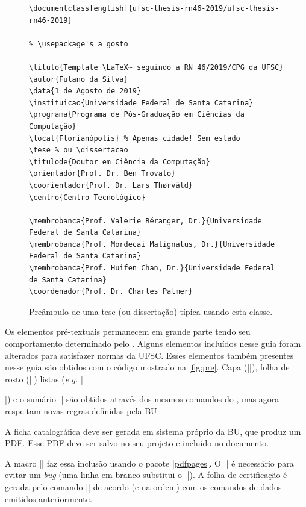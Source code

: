 \documentclass[embeddedlogo]{../ufsc-thesis-rn46-2019}
\begin{document}
\begin{figure}[tb]
  \centering
  \caption{Preâmbulo de uma tese (ou dissertação) típica usando esta classe.}
  \label{fig:preambulo}

  \begin{verbatim}
\documentclass[english]{ufsc-thesis-rn46-2019/ufsc-thesis-rn46-2019}

% \usepackage's a gosto

\titulo{Template \LaTeX~ seguindo a RN 46/2019/CPG da UFSC}
\autor{Fulano da Silva}
\data{1 de Agosto de 2019}
\instituicao{Universidade Federal de Santa Catarina}
\programa{Programa de Pós-Graduação em Ciências da Computação}
\local{Florianópolis} % Apenas cidade! Sem estado
\tese % ou \dissertacao
\titulode{Doutor em Ciência da Computação}
\orientador{Prof. Dr. Ben Trovato}
\coorientador{Prof. Dr. Lars Thørväld}
\centro{Centro Tecnológico}

\membrobanca{Prof. Valerie Béranger, Dr.}{Universidade Federal de Santa Catarina}
\membrobanca{Prof. Mordecai Malignatus, Dr.}{Universidade Federal de Santa Catarina}
\membrobanca{Prof. Huifen Chan, Dr.}{Universidade Federal de Santa Catarina}
\coordenador{Prof. Dr. Charles Palmer}
  \end{verbatim}
\end{figure}

Os elementos pré-textuais permanecem em grande parte tendo seu comportamento
determinado pelo \abnTeX. Alguns elementos incluídos nesse guia foram alterados
para satisfazer normas da UFSC. Esses elementos também presentes
nesse guia são obtidos com o código mostrado na \autoref{fig:pre}. Capa
(\mt|\imprimircapa|), folha de rosto (\mt|\imprimirfolhaderosto*|) listas
(\emph{e.g.} \mt|\listoffigures*|) e o sumário \mt|\tableofcontents*| são
obtidos através dos mesmos comandos do \abnTeX, mas agora respeitam novas
regras definidas pela BU.

A ficha catalográfica deve ser gerada em sistema próprio da BU, que produz um
PDF. Esse PDF deve ser salvo no seu projeto e incluído no documento.

A macro \mt|| faz essa inclusão usando o
pacote \href{https://www.ctan.org/pkg/pdfpages}{\mt|pdfpages|}. O \mt|\protect|
é necessário para evitar um \emph{bug} (uma linha em branco substitui o
\mt|\protect|).  A folha de certificação é gerada pelo comando
\mt|\imprimirfolhadecertificacao| de acordo (e na ordem) com os comandos de
dados emitidos anteriormente.
\end{document}
